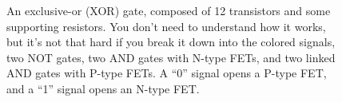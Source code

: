\begin{figure}[ht!]
\begin{center}

\caption{An exclusive-or (XOR) gate, composed of 12 transistors and some supporting resistors. You don't need to understand how it works, but it's not that hard if you break it down into the colored signals, two NOT gates, two AND gates with N-type FETs, and two linked AND gates with P-type FETs. A ``0'' signal opens a P-type FET, and a ``1'' signal opens an N-type FET.}
\label{fig:xorgate}
\end{center}
\end{figure}

\clearpage


